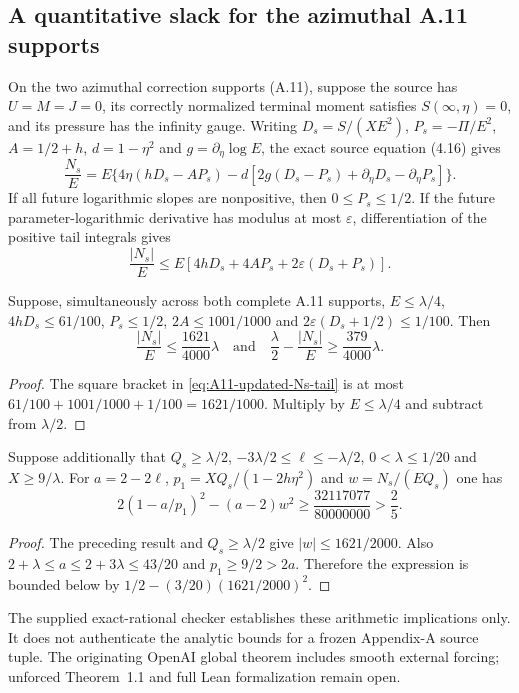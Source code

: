 \subsection*{A quantitative slack for the azimuthal A.11 supports}
On the two azimuthal correction supports (A.11), suppose the source has
$U=M=J=0$, its correctly normalized terminal moment satisfies
$S(\infty,\eta)=0$, and its pressure has the infinity gauge.
Writing $D_s=S/(XE^2)$, $P_s=-\Pi/E^2$,
$A=1/2+h$, $d=1-\eta^2$ and $g=\partial_\eta\log E$,
the exact source equation (4.16) gives
\[
\frac{N_s}{E}
=E\{4\eta(hD_s-AP_s)-d[
2g(D_s-P_s)+\partial_\eta D_s-\partial_\eta P_s]\}.
\]
If all future logarithmic slopes are nonpositive,
then $0\le P_s\le1/2$. If the future parameter-logarithmic
derivative has modulus at most $\varepsilon$, differentiation of
the positive tail integrals gives
\begin{equation}\label{eq:A11-updated-Ns-tail}
\frac{|N_s|}{E}
\le E[4hD_s+4AP_s+2\varepsilon(D_s+P_s)].
\end{equation}
\begin{proposition}
Suppose, simultaneously across both complete A.11 supports,
$E\le\lambda/4$, $4hD_s\le61/100$, $P_s\le1/2$,
$2A\le1001/1000$ and $2\varepsilon(D_s+1/2)\le1/100$.
Then
\[
\frac{|N_s|}{E}\le\frac{1621}{4000}\lambda
\quad\text{and}\quad
\frac\lambda2-\frac{|N_s|}{E}\ge\frac{379}{4000}\lambda.
\]
\end{proposition}
\begin{proof}
The square bracket in \eqref{eq:A11-updated-Ns-tail}
is at most $61/100+1001/1000+1/100=1621/1000$.
Multiply by $E\le\lambda/4$ and subtract from $\lambda/2$.
\end{proof}
\begin{corollary}
Suppose additionally that $Q_s\ge\lambda/2$,
$-3\lambda/2\le\ell\le-\lambda/2$, $0<\lambda\le1/20$
and $X\ge9/\lambda$. For $a=2-2\ell$,
$p_1=XQ_s/(1-2h\eta^2)$ and $w=N_s/(EQ_s)$ one has
\[
2(1-a/p_1)^2-(a-2)w^2
\ge\frac{32117077}{80000000}>\frac25.
\]
\end{corollary}
\begin{proof}
The preceding result and $Q_s\ge\lambda/2$ give
$|w|\le1621/2000$. Also
$2+\lambda\le a\le2+3\lambda\le43/20$ and
$p_1\ge9/2>2a$. Therefore the expression is bounded
below by $1/2-(3/20)(1621/2000)^2$.
\end{proof}
The supplied exact-rational checker establishes these arithmetic
implications only. It does not authenticate the analytic bounds
for a frozen Appendix-A source tuple. The originating OpenAI
global theorem includes smooth external forcing; unforced
Theorem~1.1 and full Lean formalization remain open.

